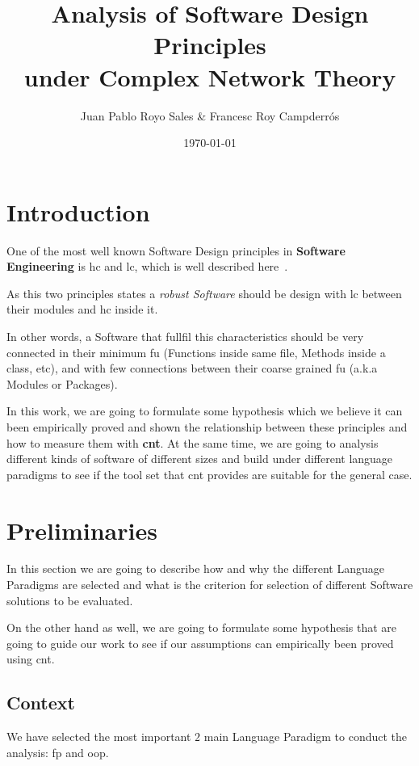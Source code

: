 \documentclass[12pt, a4paper]{article}
\title{%
      Analysis of Software Design Principles \\
      under Complex Network Theory\\
}
\author{Juan Pablo Royo Sales \& Francesc Roy Campderrós}
\affil{Universitat Politècnica de Catalunya}
\date\today
\begin{document}
\maketitle

\tableofcontents

\section{Introduction}
One of the most well known Software Design principles in \textbf{Software Engineering} is \acrfull{hc} and \acrfull{lc}, which is well described here~\cite{cohesion_coupling}.

As this two principles states a \textit{robust Software} should be design with \acrlong{lc} between their modules and \acrlong{hc} inside it. 

In other words, a Software that fullfil this characteristics should be very connected in their minimum \acrfull{fu} (Functions inside same file, Methods inside a class, etc), and with few connections between their coarse grained \acrshort{fu} (a.k.a Modules or Packages).

In this work, we are going to formulate some hypothesis which we believe it can been empirically proved and shown the relationship between these principles and how to measure them with \textbf{\acrfull{cnt}}.
At the same time, we are going to analysis different kinds of software of different sizes and build under different language paradigms to see if the tool set that \acrshort{cnt} provides are suitable for the general case. 

\section{Preliminaries}
In this section we are going to describe how and why the different Language Paradigms are selected and what is the criterion for selection of different Software solutions to be evaluated.

On the other hand as well, we are going to formulate some hypothesis that are going to guide our work to see if our assumptions can empirically been proved using \acrlong{cnt}.

\subsection{Context}
We have selected the most important $2$ main Language Paradigm to conduct the analysis: \acrfull{fp} and \acrfull{oop}. 
\end{document}
